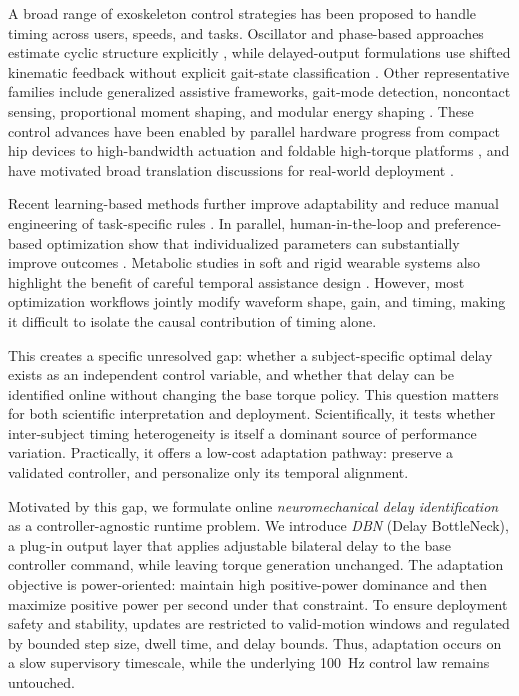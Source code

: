 \documentclass[lettersize,journal]{IEEEtran}
\begin{document}
A broad range of exoskeleton control strategies has been proposed to handle timing across users, speeds, and tasks. Oscillator and phase-based approaches estimate cyclic structure explicitly \cite{ronsse2010adaptive,ronsse2011synchrony,ronsse2011oscillator,seo2015afo,seo2018adaptive,seo2016fullyautonomous,jang2015online}, while delayed-output formulations use shifted kinematic feedback without explicit gait-state classification \cite{lim2019ral,lim2019tro,lim2023ral}. Other representative families include generalized assistive frameworks, gait-mode detection, noncontact sensing, proportional moment shaping, and modular energy shaping \cite{oh2015generalized,huo2018fast,crea2019capacitive,gasparri2019proportional,lin2024modular}. These control advances have been enabled by parallel hardware progress from compact hip devices to high-bandwidth actuation and foldable high-torque platforms \cite{sugar2016hesa,murray2014assistive,mooney2014autonomous,yu2020quasi,yan2025compact}, and have motivated broad translation discussions for real-world deployment \cite{siviy2023opportunities,maggioni2023aan}.

Recent learning-based methods further improve adaptability and reduce manual engineering of task-specific rules \cite{luo2024nature,kim2025drl,molinaro2024estimating,lee2024sciadv}. In parallel, human-in-the-loop and preference-based optimization show that individualized parameters can substantially improve outcomes \cite{ding2018humanloop,lee2023userpref}. Metabolic studies in soft and rigid wearable systems also highlight the benefit of careful temporal assistance design \cite{kim2019science,lee2017runningexosuit}. However, most optimization workflows jointly modify waveform shape, gain, and timing, making it difficult to isolate the causal contribution of timing alone.

This creates a specific unresolved gap: whether a subject-specific optimal delay exists as an independent control variable, and whether that delay can be identified online without changing the base torque policy. This question matters for both scientific interpretation and deployment. Scientifically, it tests whether inter-subject timing heterogeneity is itself a dominant source of performance variation. Practically, it offers a low-cost adaptation pathway: preserve a validated controller, and personalize only its temporal alignment.

Motivated by this gap, we formulate online \emph{neuromechanical delay identification} as a controller-agnostic runtime problem. We introduce \emph{DBN} (Delay BottleNeck), a plug-in output layer that applies adjustable bilateral delay to the base controller command, while leaving torque generation unchanged. The adaptation objective is power-oriented: maintain high positive-power dominance and then maximize positive power per second under that constraint. To ensure deployment safety and stability, updates are restricted to valid-motion windows and regulated by bounded step size, dwell time, and delay bounds. Thus, adaptation occurs on a slow supervisory timescale, while the underlying 100~Hz control law remains untouched.
\end{document}
